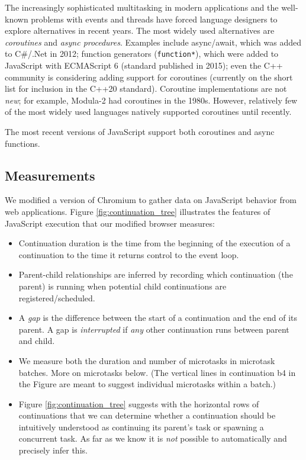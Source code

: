 \documentclass[sigplan,10pt,review,anonymous]{acmart}\settopmatter{printfolios=true,printccs=false,printacmref=false}
\begin{document}
The increasingly sophisticated multitasking in modern applications and the well-known problems with events and threads have forced language designers to explore alternatives in recent years.
The most widely used alternatives are \emph{coroutines} and \emph{async procedures}.
Examples include async/await, which was added to C\#/.Net in 2012; function generators (\texttt{function*}), which were added to JavaScript with ECMAScript 6 (standard published in 2015); even the C++ community is considering adding support for coroutines (currently on the short list for inclusion in the C++20 standard).
Coroutine implementations are not \emph{new}; for example, Modula-2 had coroutines in the 1980s.
However, relatively few of the most widely used languages natively supported coroutines until recently.

The most recent versions of JavaScript support both coroutines and async functions.

\subsection{Measurements}

We modified a version of Chromium to gather data on JavaScript behavior from web applications.
Figure \ref{fig:continuation_tree} illustrates the features of JavaScript execution that our modified browser measures:

\begin{itemize}
\item Continuation duration is the time from the beginning of the execution of a continuation to the time it returns control to the event loop.
\item Parent-child relationships are inferred by recording which continuation (the parent) is running when potential child continuations are registered/scheduled.
\item A \emph{gap} is the difference between the start of a continuation and the end of its parent.
  A gap is \emph{interrupted} if \emph{any} other continuation runs between parent and child.
\item We measure both the duration and number of microtasks in microtask batches.
  More on microtasks below.
  (The vertical lines in continuation b4 in the Figure are meant to suggest individual microtasks within a batch.)
\item Figure \ref{fig:continuation_tree} suggests with the horizontal rows of continuations that we can determine whether a continuation should be intuitively understood as continuing its parent's task or spawning a concurrent task.
  As far as we know it is \emph{not} possible to automatically and precisely infer this.
\end{itemize}
\end{document}
